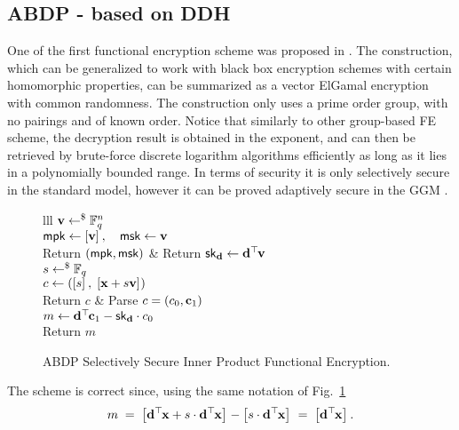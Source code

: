 
\subsection{ABDP - based on DDH}
One of the first functional encryption scheme was proposed in \cite{PKC:ABDP15}.
The construction, which can be generalized to work with black box encryption schemes with certain homomorphic properties, can be summarized as a vector ElGamal encryption with common randomness.
The construction only uses a prime order group, with no pairings and of known order.
Notice that similarly to other group-based FE scheme, the decryption result is obtained in the exponent, and can then be retrieved by brute-force discrete logarithm algorithms efficiently as long as it lies in a polynomially bounded range.
In terms of security it is only selectively secure in the standard model, however it can be proved adaptively secure in the GGM .

\begin{figure}[htb]
\centering
\begin{pcarray}{lll}
		{
			$\mathbf{v} \gets^{\$} \mathbb{F}_q^n$
				\\
			$\mathsf{mpk} \gets \left[{\mathbf{v}}\right]_{}, \quad \mathsf{msk} \gets \mathbf{v}$
				\\
			Return $(\mathsf{mpk}, \mathsf{msk})$
 		}
	&
		{
			Return $\mathsf{sk}_{\mathbf{d}} \gets \mathbf{d}^\top\hspace{-.1em} \mathbf{v}$
		}
	\\
		{
			$s \gets^{\$} \mathbb{F}_q$
				\\
			$c \gets \left( \left[{s}\right]_{}, 
				\; 
			\left[{\mathbf{x} + s \mathbf{v}}\right]_{} \right)$
				\\
			Return $c$
		}
	&
		{
			Parse $c = (c_0, \mathbf{c}_1)$
				\\
			$m \gets \mathbf{d}^\top\hspace{-.1em} \mathbf{c}_1 - \mathsf{sk}_{\mathbf{d}} \cdot c_0$
				\\
			Return $m$
		}
\end{pcarray}
\caption{ABDP Selectively Secure Inner Product Functional Encryption.}
\label{prot:ABDP15:IPFE}
\end{figure}

The scheme is correct since, using the same notation of Fig.~\ref{prot:ABDP15:IPFE}
\[
	m
		\; = \;
	\left[{\mathbf{d}^\top\hspace{-.1em} \mathbf{x} + s \cdot \mathbf{d}^\top\hspace{-.1em} \mathbf{x}}\right]_{}
		-
	\left[{s \cdot \mathbf{d}^\top\hspace{-.1em} \mathbf{x}}\right]_{}
		\; = \;
	\left[{\mathbf{d}^\top\hspace{-.1em} \mathbf{x}}\right]_{}.
\]


